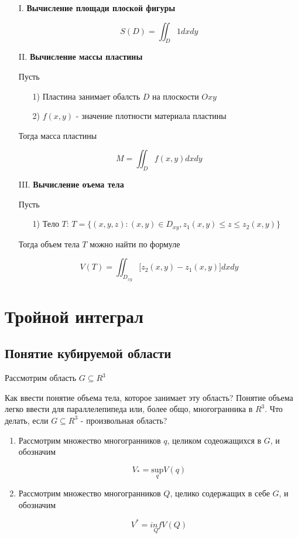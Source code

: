 \documentclass[a4paper, 14pt]{report}
\begin{document}
\begin{enumerate}
    \item[I.] \textbf{Вычисление площади плоской фигуры}

    $$
        S(D) = \iint_D 1 dx dy
    $$

    \item[II.] \textbf{Вычисление массы пластины}

        Пусть 
        \begin{enumerate}
            \item[1)] Пластина занимает обалсть $D$ на плоскости $Oxy$
            \item[2)] $f(x,y)$ - значение плотности материала пластины
        \end{enumerate}

        Тогда масса пластины

        $$
        M = \iint_D f(x,y) dxdy
        $$

    \item[III.] \textbf{Вычисление оъема тела}

        Пусть

        \begin{enumerate}
            \item[1)] Тело $T$: $T = \{ (x,y,z): (x,y) \in D_{xy}, z_1(x,y) \le z \le z_2(x,y) \}$
        \end{enumerate}

        Тогда объем тела $T$ можно найти по формуле

        $$
        V(T) = \iint_{D_{xy}} \big[ z_2(x,y) - z_1(x,y) \big] dxdy
        $$

\end{enumerate}

\chapter{Тройной интеграл}

\section{Понятие кубируемой области}

Рассмотрим область $G \subseteq R^3$

Как ввести понятие объема тела, которое занимает эту область? Понятие объема легко ввести для параллелепипеда или, более общо, многогранника в $R^3$. Что делать, если $G \subseteq R^3$ - произвольная область?

\begin{enumerate}
    \item Рассмотрим множество многогранников $q$, целиком содеожащихся в $G$, и обозначим 

        $$
        V_* = \underset{q}{\text{sup}} V(q)
        $$

    \item Рассмотрим множество многогранников $Q$, целико содержащих в себе $G$, и обозначим 

        $$
        V^* = \underset{Q}{inf} V(Q)
        $$
\end{enumerate}
\end{document}
